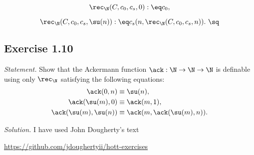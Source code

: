 \documentclass[12pt]{article}
\begin{document}
$$\rec_\N(C,c_0,c_s,0):\eq c_0,$$

$$\rec_\N(C,c_0,c_s,\su(n)):\eq c_s(n,\rec_\N(C,c_0,c_s,n)).\ \sq$$


\subsection{Exercise 1.10}

\emph{Statement.} Show that the Ackermann function $\ack:\N\to\N\to\N$ is definable using only $\rec_\N$ satisfying the following equations:
\begin{align*}
\ack(0,n)&\equiv\su(n),\\
\ack(\su(m),0)&\equiv\ack(m,1),\\
\ack(\su(m),\su(n))&\equiv\ack(m,\ack(\su(m),n)).
\end{align*}

\nn\emph{Solution.} I have used John Dougherty's text 

\nn\href{https://github.com/jdoughertyii/hott-exercises}{https://github.com/jdoughertyii/hott-exercises}
\end{document}
